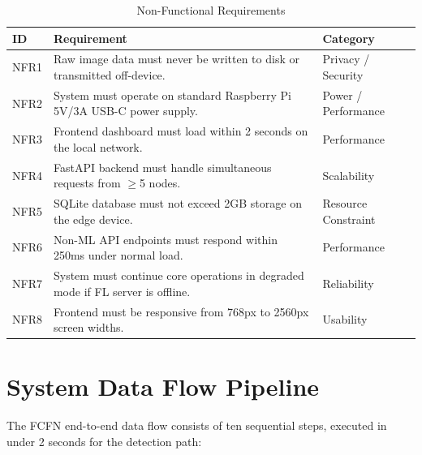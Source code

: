 \documentclass[12pt,a4paper]{report}
\begin{document}
\begin{table}[ht]
\centering
\caption{Non-Functional Requirements}
\label{tab:nfr}
\begin{tabularx}{\textwidth}{C{0.08\textwidth} L{0.60\textwidth} C{0.25\textwidth}}
\toprule
\textbf{ID} & \textbf{Requirement} & \textbf{Category} \\
\midrule
NFR1 & Raw image data must never be written to disk or transmitted off-device. & Privacy / Security \\
NFR2 & System must operate on standard Raspberry Pi 5V/3A USB-C power supply. & Power / Performance \\
NFR3 & Frontend dashboard must load within 2 seconds on the local network. & Performance \\
NFR4 & FastAPI backend must handle simultaneous requests from $\geq$5 nodes. & Scalability \\
NFR5 & SQLite database must not exceed 2GB storage on the edge device. & Resource Constraint \\
NFR6 & Non-ML API endpoints must respond within 250ms under normal load. & Performance \\
NFR7 & System must continue core operations in degraded mode if FL server is offline. & Reliability \\
NFR8 & Frontend must be responsive from 768px to 2560px screen widths. & Usability \\
\bottomrule
\end{tabularx}
\end{table}

\section{System Data Flow Pipeline}

The FCFN end-to-end data flow consists of ten sequential steps, executed in under 2 seconds for the detection path:
\end{document}
